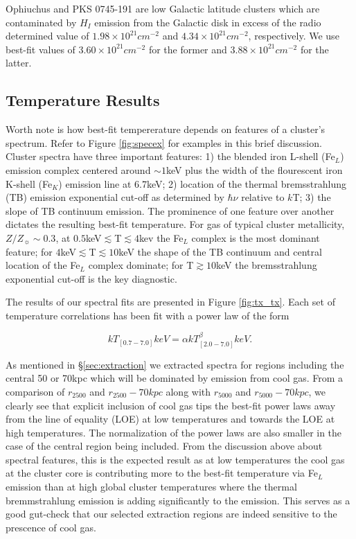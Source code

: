 \documentclass[12pt, preprint]{aastex}
\begin{document}
Ophiuchus and PKS 0745-191 are low Galactic latitude
clusters which are contaminated by $H_{I}$
emission from the Galactic disk in excess of the radio determined value of
$1.98\times10^{21} cm^{-2}$ and $4.34\times10^{21} cm^{-2}$,
respectively. We use best-fit values of $3.60\times10^{21} cm^{-2}$
for the former and $3.88\times10^{21} cm^{-2}$ for the latter.

\subsection{Temperature Results} \label{sec:tspecresults}

Worth note is how best-fit tempererature depends on features
of a cluster's spectrum. Refer to Figure \ref{fig:specex} 
for examples in this brief discussion. Cluster spectra have three
important features: 1) the blended iron L-shell (Fe$_L$) emission
complex centered around $\sim 1$keV plus the width of the flourescent
iron K-shell (Fe$_K$) emission line at 6.7keV; 2) location of the thermal
bremsstrahlung (TB) emission exponential cut-off as determined by $\hbar\nu$ relative
to $k$T; 3) the slope of TB continuum emission. The prominence of one
feature over another dictates the resulting best-fit temperature. For
gas of typical cluster metallicity, $Z/Z_{\sun} \sim 0.3$, at
$0.5$keV$\lesssim$T$\lesssim 4$kev the Fe$_L$ complex is the most dominant feature; for
$4$keV$\lesssim$T$\lesssim 10$keV the shape of the TB continuum
and central location of the Fe$_L$ complex dominate; for T$\gtrsim
10$keV the bremsstrahlung exponential cut-off is the key diagnostic.

The results of our spectral fits are presented in Figure
\ref{fig:tx_tx}. Each set of temperature correlations has been fit
with a power law of the form

\begin{equation}
k T_{[0.7-7.0]}keV = \alpha k T_{[2.0-7.0]}^{\beta}keV.
\end{equation}

As mentioned in \S\ref{sec:extraction} we extracted
spectra for regions including the central 50 or 70kpc which will be
dominated by emission from cool gas. From a comparison of $r_{2500}$ and
$r_{2500}-70kpc$ along with $r_{5000}$ and $r_{5000}-70kpc$, we
clearly see that explicit inclusion of cool gas tips the best-fit
power laws away from the line of equality (LOE) at low temperatures
and towards the LOE at high temperatures. The normalization of the power laws
are also smaller in the case of the central region being included. From
the discussion above about spectral features, this is the expected
result as at low temperatures the cool gas at the cluster core is
contributing more to the best-fit temperature via Fe$_L$ emission than
at high global cluster temperatures where the thermal bremmstrahlung
emission is adding significantly to the emission. This
serves as a good gut-check that our selected extraction regions are
indeed sensitive to the prescence of cool gas.
\end{document}
